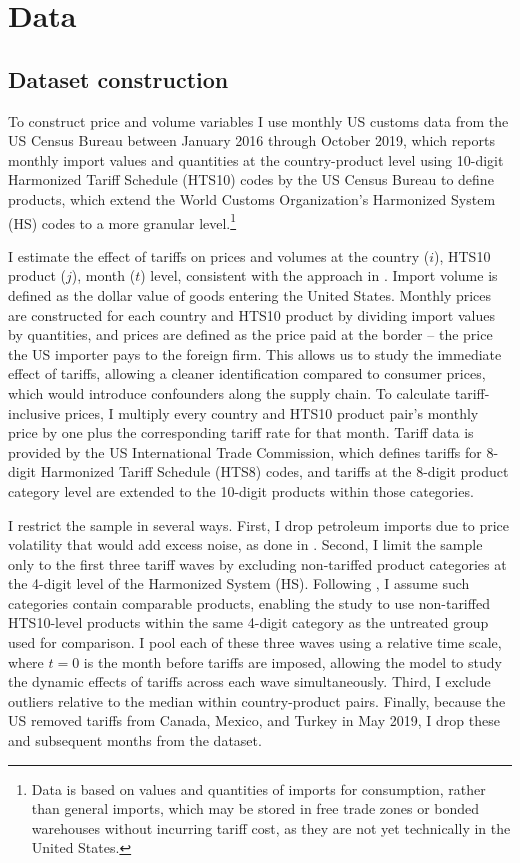 \section{Data}\label{sec:data}

\subsection{Dataset construction}

To construct price and volume variables I use monthly US customs data from the US Census Bureau between January 2016 through October 2019, which reports monthly import values and quantities at the country-product level using 10-digit Harmonized Tariff Schedule (HTS10) codes by the US Census Bureau to define products, which extend the World Customs Organization's Harmonized System (HS) codes to a more granular level.\footnote{Data is based on values and quantities of imports for consumption, rather than general imports, which may be stored in free trade zones or bonded warehouses without incurring tariff cost, as they are not yet technically in the United States.} 

I estimate the effect of tariffs on prices and volumes at the country ($i$), HTS10 product ($j$), month ($t$) level, consistent with the approach in \textcite{amiti_whos_2020}. Import volume is defined as the dollar value of goods entering the United States. Monthly prices are constructed for each country and HTS10 product by dividing import values by quantities, and prices are defined as the price paid at the border -- the price the US importer pays to the foreign firm. This allows us to study the immediate effect of tariffs, allowing a cleaner identification compared to consumer prices, which would introduce confounders along the supply chain. To calculate tariff-inclusive prices, I multiply every country and HTS10 product pair's monthly price by one plus the corresponding tariff rate for that month. Tariff data is provided by the US International Trade Commission, which defines tariffs for 8-digit Harmonized Tariff Schedule (HTS8) codes, and tariffs at the 8-digit product category level are extended to the 10-digit products within those categories. 

I restrict the sample in several ways. First, I drop petroleum imports due to price volatility that would add excess noise, as done in \textcite{amiti_whos_2020}. Second, I limit the sample only to the first three tariff waves by excluding non-tariffed product categories at the 4-digit level of the Harmonized System (HS). Following \textcite{amiti_whos_2020}, I assume such categories contain comparable products, enabling the study to use non-tariffed HTS10-level products within the same 4-digit category as the untreated group used for comparison. I pool each of these three waves using a relative time scale, where $t=0$ is the month before tariffs are imposed, allowing the model to study the dynamic effects of tariffs across each wave simultaneously. Third, I exclude outliers relative to the median within country-product pairs. Finally, because the US removed tariffs from Canada, Mexico, and Turkey in May 2019, I drop these and subsequent months from the dataset.

